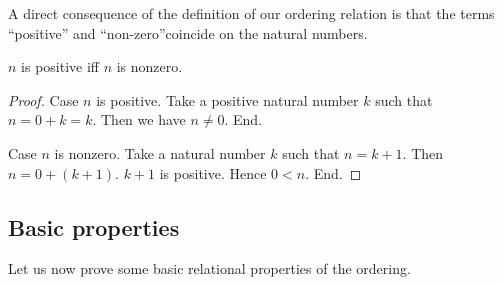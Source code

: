 \documentclass[../../arithmetic.ftl.tex]{subfiles}
\begin{document}
  \noindent A direct consequence of the definition of our ordering relation is
  that the terms \enquote{positive} and \enquote{non-zero}coincide on the
  natural numbers.

  \begin{forthel}
    \begin{proposition}\label{Arithmetic_02_01_115117}
      $n$ is positive iff $n$ is nonzero.
    \end{proposition}
    \begin{proof}
      Case $n$ is positive.
        Take a positive natural number $k$ such that $n = 0 + k = k$.
        Then we have $n \neq 0$.
      End.

      Case $n$ is nonzero.
        Take a natural number $k$ such that $n = k + 1$.
        Then $n = 0 + (k + 1)$.
        $k + 1$ is positive.
        Hence $0 < n$.
      End.
    \end{proof}
  \end{forthel}


  \subsection{Basic properties}

  Let us now prove some basic relational properties of the
  ordering.
\end{document}
